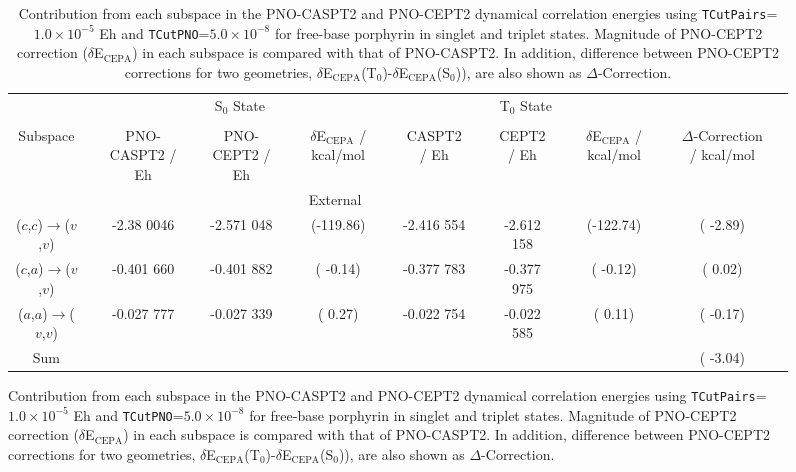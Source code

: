 \documentclass[aip,jcp,amsmath,twocolumn,floatfix,reprint,fleqn]{revtex4-1}
\begin{document}
{
\squeezetable
\begin{figure}    
\begin{longtable}[!ht]{cccccccccccccccc}
  \caption{\label{tab:h2p-analysis}
    Contribution from each subspace in the PNO-CASPT2 and PNO-CEPT2 dynamical correlation energies using {\tt TCutPairs}=$1.0\times 10^{-5}$ Eh and {\tt TCutPNO}=$5.0\times 10^{-8}$ for free-base porphyrin in singlet and triplet states.
    Magnitude of PNO-CEPT2 correction ($\delta$E${}_\text{CEPA}$) in each subspace is compared with that of PNO-CASPT2.
    In addition, difference between PNO-CEPT2 corrections for two geometries, $\delta$E${}_\text{CEPA}$(T${}_0$)-$\delta$E${}_\text{CEPA}$(S${}_0$)), are also shown as $\Delta$-Correction.
}
  \\
\hline  
\hline
 {}                                                               && \multicolumn{5}{c}{S${}_0$ State} && \multicolumn{5}{c}{T${}_0$ State} \\
\cline{3-14} \\      
 Subspace                                                         && PNO-CASPT2 / Eh && PNO-CEPT2 / Eh && $\delta$E${}_\text{CEPA}$ / kcal/mol && CASPT2 / Eh && CEPT2 / Eh && $\delta$E${}_\text{CEPA}$ / kcal/mol && $\Delta$-Correction / kcal/mol \\
\hline
                                                                  && \multicolumn{10}{c}{External} \\
($c$,$c$)$\rightarrow$($v$,$v$)                                   && -2.38 0046  && -2.571 048  && (-119.86)  && -2.416 554  && -2.612 158  && (-122.74)  && (  -2.89)\\
($c$,$a$)$\rightarrow$($v$,$v$)                                   && -0.401 660  && -0.401 882  && (  -0.14)  && -0.377 783  && -0.377 975  && (  -0.12)  && (   0.02)\\
($a$,$a$)$\rightarrow$($v$,$v$)                                   && -0.027 777  && -0.027 339  && (   0.27)  && -0.022 754  && -0.022 585  && (   0.11)  && (  -0.17)\\
Sum                                                               &&             &&             &&            &&             &&             &&            && (  -3.04)\\
                                                                                                                                          

\end{longtable}
\end{figure}}
\end{document}
